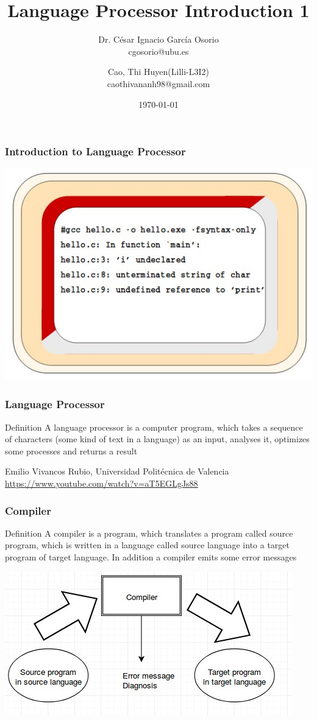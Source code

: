 \documentclass{beamer}
\title{Language Processor Introduction 1}
\subtitle{Dr. César Ignacio García Osorio \\ cgosorio@ubu.es}
\author{Cao, Thi Huyen(Lilli-L3I2) \\ caothivananh98@gmail.com}
\institute{University of Burgos}
\date{\today}
\begin{document}
\begin{frame}
\titlepage
\end{frame}

\begin{frame}
\frametitle{Introduction to Language Processor}
\includegraphics[scale=0.6]{1.jpg}
\end{frame}
\begin{frame}
\frametitle{Language Processor}
\begin{block}{Definition}
A language processor is a computer program, which takes a sequence of characters (some kind of text in a language) as an input, analyses it, optimizes some processes and returns a result
\end{block}
Emilio Vivancos
Rubio, Universidad Politécnica de Valencia
\href{https://www.youtube.com/watch?v=aT5EGLgJs88/}{\underline{https://www.youtube.com/watch?v=aT5EGLgJs88}}
\end{frame}
\begin{frame}
\frametitle{Compiler}
\begin{block}{Definition}
A compiler is a program, which translates a program called source program, which is written in a language called source language into a target program of target language. In addition a compiler emits some error messages
\end{block}
\includegraphics[scale=0.7]{2.jpg}
\end{frame}
\end{document}
